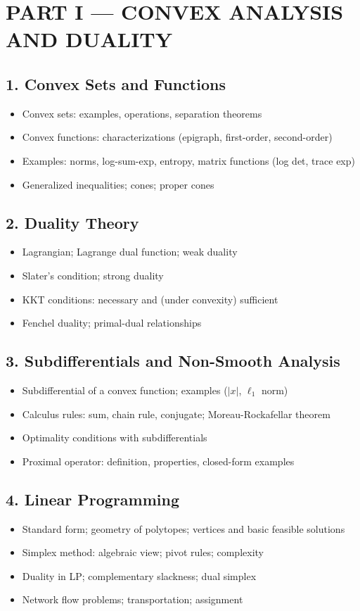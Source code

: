 \section{PART I --- CONVEX ANALYSIS AND DUALITY}

\subsection{1. Convex Sets and Functions}
\begin{itemize}
\item Convex sets: examples, operations, separation theorems
\item Convex functions: characterizations (epigraph, first-order, second-order)
\item Examples: norms, log-sum-exp, entropy, matrix functions (log det, trace exp)
\item Generalized inequalities; cones; proper cones
\end{itemize}

\subsection{2. Duality Theory}
\begin{itemize}
\item Lagrangian; Lagrange dual function; weak duality
\item Slater's condition; strong duality
\item KKT conditions: necessary and (under convexity) sufficient
\item Fenchel duality; primal-dual relationships
\end{itemize}

\subsection{3. Subdifferentials and Non-Smooth Analysis}
\begin{itemize}
\item Subdifferential of a convex function; examples ($|x|$, $\ell_1$ norm)
\item Calculus rules: sum, chain rule, conjugate; Moreau-Rockafellar theorem
\item Optimality conditions with subdifferentials
\item Proximal operator: definition, properties, closed-form examples
\end{itemize}

\subsection{4. Linear Programming}
\begin{itemize}
\item Standard form; geometry of polytopes; vertices and basic feasible solutions
\item Simplex method: algebraic view; pivot rules; complexity
\item Duality in LP; complementary slackness; dual simplex
\item Network flow problems; transportation; assignment
\end{itemize}

